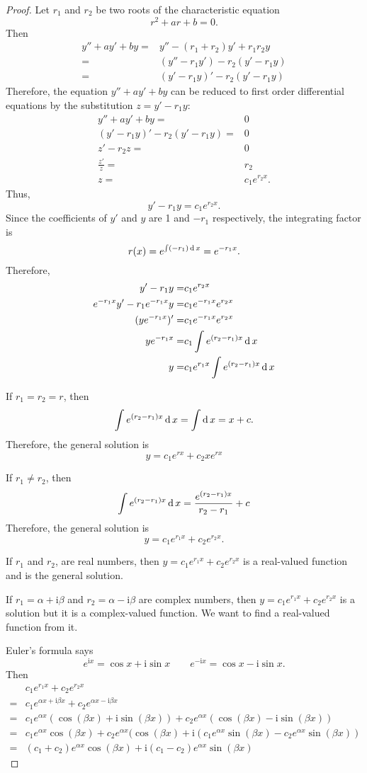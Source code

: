 \begin{proof}
Let $r_1$ and $r_2$ be two roots of the characteristic equation 
\[r^2+ar+b=0.\]
Then
\[
\begin{aligned}
  y''+ay'+by=&y''-(r_1+r_2)y'+r_1r_2 y\\
  =&(y''-r_1y')-r_2(y'-r_1 y)\\
  =&(y'-r_1y)'-r_2(y'-r_1 y)
\end{aligned} 
\]
Therefore, the equation $y''+ay'+by$ can be reduced to first order differential equations by the substitution $z=y'-r_1y$:
\[
\begin{aligned}
  y''+ay'+by=&0\\
  (y'-r_1y)'-r_2(y'-r_1 y)=&0\\
  z'-r_2z=&0\\
  \frac{z'}{z}=&r_2\\
  z=&c_1e^{r_2x}.
\end{aligned}  
\]
Thus,
\[y'-r_1y=c_1e^{r_2x}.\]
Since the coefficients of $y'$ and $y$ are 1 and $-r_1$ respectively, the integrating factor is
\[r(x)=e^{\int(-r_1)\operatorname{d} x}=e^{-r_1x}.\]
Therefore,
\[
  \begin{aligned}
    y'-r_1y=&c_1e^{r_2x}\\
    e^{-r_1x}y'-r_1e^{-r_1x}y=&c_1e^{-r_1x}e^{r_2x}\\
    (ye^{-r_1x})'=&c_1e^{-r_1x}e^{r_2x}\\
    ye^{-r_1x}=&c_1\int e^{(r_2-r_1)x}\operatorname{d} x\\
    y=&c_1e^{r_1x}\int e^{(r_2-r_1)x}\operatorname{d} x
  \end{aligned}
\]

If $r_1=r_2=r$, then 
\[\int e^{(r_2-r_1)x}\operatorname{d} x=\int \operatorname{d} x=x+c.\]
Therefore, the general solution is 
\[y=c_1e^{rx}+c_2xe^{rx}\]

If $r_1\ne r_2$, then
\[\int e^{(r_2-r_1)x}\operatorname{d} x=\frac{e^{(r_2-r_1)x}}{r_2-r_1}+c\]
Therefore, the general solution is 
\[y=c_1e^{r_1x}+c_2e^{r_2x}.\]

If $r_1$ and $r_2$, are real numbers, then $y=c_1e^{r_1x}+c_2e^{r_2x}$ is a real-valued function and is the general solution. 

If $r_1=\alpha +\mathrm{i}\beta$ and $r_2=\alpha - \mathrm{i}\beta$ are complex numbers, then $y=c_1e^{r_1x}+c_2e^{r_2x}$ is a solution but it is a complex-valued function. We want to find a real-valued function from it.

Euler’s formula says
\[e^{\mathrm{i}x}=\cos x+\mathrm{i}\sin x \qquad e^{-\mathrm{i}x}=\cos x-\mathrm{i}\sin x.\]
Then
\[
\begin{aligned}
  &c_1e^{r_1x}+c_2e^{r_2x}\\
  =&c_1e^{\alpha x+\mathrm{i}\beta x}+c_2e^{\alpha x-\mathrm{i}\beta x}\\
  =&c_1e^{\alpha x}(\cos(\beta  x)+\mathrm{i}\sin(\beta x))+c_2e^{\alpha x}(\cos(\beta  x)-\mathrm{i}\sin(\beta x))\\
  =&c_1e^{\alpha x}\cos(\beta  x)+c_2e^{\alpha x}(\cos(\beta  x)+\mathrm{i}\left(c_1e^{\alpha x}\sin(\beta x)-c_2e^{\alpha x}\sin(\beta x)\right)\\
  =&(c_1+c_2)e^{\alpha x}\cos(\beta  x)+\mathrm{i}(c_1-c_2)e^{\alpha x}\sin(\beta x)
\end{aligned}  
\]


\end{proof}
